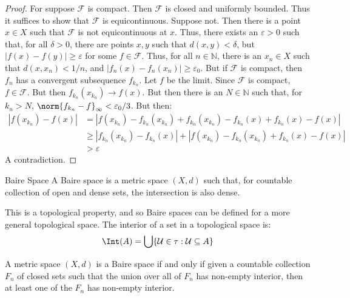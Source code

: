 \documentclass[crop=false,class=article,oneside]{standalone}
\begin{document}
        \begin{proof}
            For suppose $\mathscr{F}$ is compact. Then $\mathscr{F}$
            is closed and uniformly bounded. Thus it suffices to
            show that $\mathscr{F}$ is equicontinuous. Suppose not.
            Then there is a point $x\in{X}$ such that
            $\mathscr{F}$ is not equicontinuous at $x$. Thus,
            there exists an $\varepsilon>0$ such that, for all
            $\delta>0$, there are points $x,y$ such that
            $d(x,y)<\delta$, but $|f(x)-f(y)|\geq\varepsilon$
            for some $f\in\mathscr{F}$. Thus, for all
            $n\in\mathbb{N}$, there is an $x_{n}\in{X}$ such that
            $d(x,x_{n})<1/n$, and
            $|f_{n}(x)-f_{n}(x_{n})|\geq\varepsilon_{0}$. But if
            $\mathscr{F}$ is compact, then $f_{n}$ has a convergent
            subsequence $f_{k_{n}}$. Let $f$ be the limit.
            Since $\mathscr{F}$ is compact, $f\in\mathscr{F}$.
            But then $f_{k_{n}}(x_{k_{n}})\rightarrow{f}(x)$. But
            then there is an $N\in\mathbb{N}$ such that,
            for $k_{n}>N$,
            $\norm{f_{k_{n}}-f}_{\infty}<\varepsilon_{0}/3$.
            But then:
            \begin{align}
                |f(x_{k_{n}})-f(x)|&=
                |f(x_{k_{n}})-f_{k_{n}}(x_{k_{n}})
                +f_{k_{n}}(x_{k_{n}})-f_{k_{n}}(x)
                +f_{k_{n}}(x)-f(x)|\\
                &\geq|f_{k_{n}}(x_{k_{n}})-f_{k_{n}}(x)|+
                |f(x_{k_{n}})-f_{k_{n}}(x_{k_{n}})
                +f_{k_{n}}(x)-f(x)|\\
                &>\varepsilon
            \end{align}
            A contradiction.
        \end{proof}
        \begin{ldefinition}{Baire Space}
            A Baire space is a metric space $(X,d)$ such that, for
            countable collection of open and dense sets, the
            intersection is also dense.
        \end{ldefinition}
        This is a topological property, and so Baire spaces can
        be defined for a more general topological space. The
        interior of a set in a topological space is:
        \begin{equation}
            \Int(A)=
            \bigcup\{\mathcal{U}\in\tau:\mathcal{U}\subseteq{A}\}
        \end{equation}
        \begin{theorem}
            A metric space $(X,d)$ is a Baire space if and only
            if given a countable collection $F_{n}$ of closed
            sets such that the union over all of $F_{n}$ has
            non-empty interior, then at least one of the $F_{n}$
            has non-empty interior.
        \end{theorem}
\end{document}
